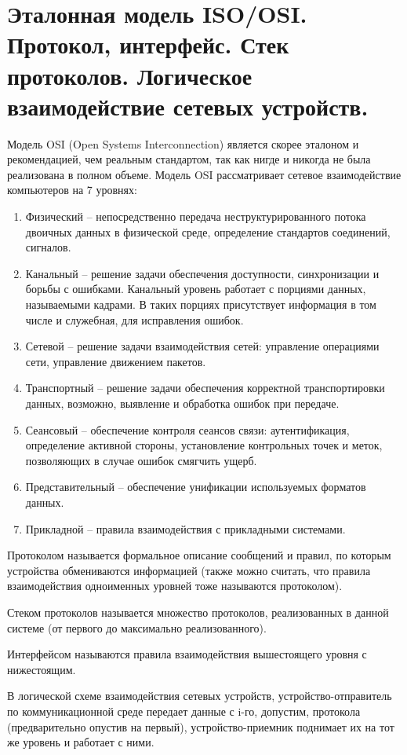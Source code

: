 \documentclass[a4paper,12pt,titlepage,finall]{article}
\begin{document}
\section{Эталонная модель ISO/OSI. Протокол, интерфейс. Стек
протоколов. Логическое взаимодействие сетевых устройств.}
Модель OSI (Open Systems Interconnection) является скорее эталоном и рекомендацией, чем реальным стандартом, так как нигде и никогда не была реализована в полном объеме. Модель OSI рассматривает сетевое взаимодействие компьютеров на 7 уровнях:
\begin{enumerate}
    \item Физический -- непосредственно передача неструктурированного потока двоичных данных в физической среде, определение стандартов соединений, сигналов.
    \item Канальный -- решение задачи обеспечения доступности, синхронизации и борьбы с ошибками. Канальный уровень работает с порциями данных, называемыми кадрами. В таких порциях присутствует информация в том числе и служебная, для исправления ошибок.
    \item Сетевой -- решение задачи взаимодействия сетей: управление операциями сети, управление движением пакетов.
    \item Транспортный -- решение задачи обеспечения корректной транспортировки данных, возможно, выявление и обработка ошибок при передаче.
    \item Сеансовый -- обеспечение контроля сеансов связи: аутентификация, определение активной стороны, установление контрольных точек и меток, позволяющих в случае ошибок смягчить ущерб.
    \item Представительный -- обеспечение унификации используемых форматов данных.
    \item Прикладной -- правила взаимодействия с прикладными системами.
\end{enumerate}

Протоколом называется формальное описание сообщений и правил, по которым устройства обмениваются информацией (также можно считать, что правила взаимодействия одноименных уровней тоже называются протоколом).

Стеком протоколов называется множество протоколов, реализованных в данной системе (от первого до максимально реализованного).

Интерфейсом называются правила взаимодействия вышестоящего уровня с нижестоящим.

В логической схеме взаимодействия сетевых устройств, устройство-отправитель по коммуникационной среде передает данные с i-го, допустим, протокола (предварительно опустив на первый), устройство-приемник поднимает их на тот же уровень и работает с ними.
\end{document}
